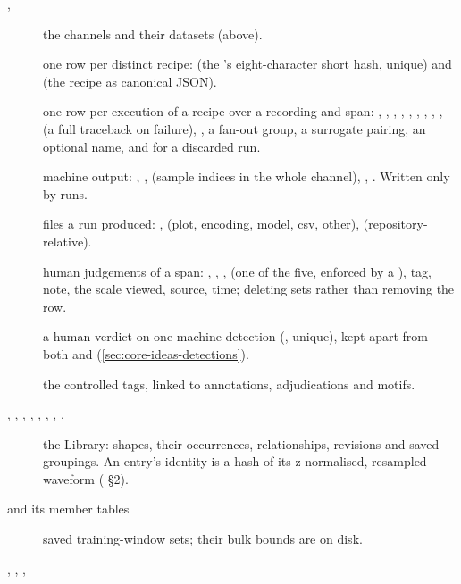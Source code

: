 \begin{description}
\item[, ] the channels and their datasets (above).
\item[] one row per distinct recipe:  (the
  's eight-character short hash, unique) and  (the recipe as
  canonical JSON).
\item[] one row per execution of a recipe over a recording and span: ,
  , , , , ,
  , , ,  (a full
  traceback on failure), , a fan-out group, a surrogate pairing, an optional name,
  and  for a discarded run.
\item[] machine output: , ,  (sample
  indices in the whole channel), , . Written only by runs.
\item[] files a run produced: ,  (plot, encoding, model,
  csv, other),  (repository-relative).
\item[] human judgements of a span: , ,
  ,  (one of the five, enforced by a ), tag, note, the scale
  viewed, source, time; deleting sets  rather than removing the row.
\item[] a human verdict on one machine detection (,
  unique), kept apart from both  and 
  (\cref{sec:core-ideas-detections}).
\item[] the controlled tags, linked to annotations, adjudications and motifs.
\item[, , , ,
  , , , ,
  ] the Library: shapes, their occurrences, relationships, revisions and
  saved groupings. An entry's identity is a hash of its z-normalised, resampled waveform
  ( \S2).
\item[ and its member tables] saved training-window sets; their bulk bounds are on
  disk.
\item[, , , ]

\end{description}
